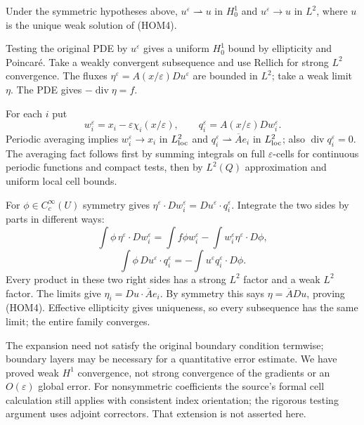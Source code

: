 \begin{theorem}
Under the symmetric hypotheses above,
$u^\varepsilon\rightharpoonup u$ in $H_0^1$ and
$u^\varepsilon\to u$ in $L^2$, where $u$ is the unique weak solution of (HOM4).
\end{theorem}
\begin{expandedproof}
Testing the original PDE by $u^\varepsilon$ gives a uniform $H_0^1$
bound by ellipticity and Poincar\'e.
Take a weakly convergent subsequence and use Rellich for strong $L^2$
convergence. The fluxes
$\eta^\varepsilon=A(x/\varepsilon)Du^\varepsilon$
are bounded in $L^2$; take a weak limit $\eta$.
The PDE gives $-\operatorname{div}\eta=f$.

For each $i$ put
\[
 w_i^\varepsilon=x_i-\varepsilon\chi_i(x/\varepsilon),\qquad
 q_i^\varepsilon=A(x/\varepsilon)Dw_i^\varepsilon .
\]
Periodic averaging implies $w_i^\varepsilon\to x_i$ in $L^2_{\rm loc}$
and $q_i^\varepsilon\rightharpoonup\overline A e_i$ in $L^2_{\rm loc}$;
also $\operatorname{div}q_i^\varepsilon=0$.
The averaging fact follows first by summing integrals on full
$\varepsilon$-cells for continuous periodic functions and compact tests,
then by $L^2(Q)$ approximation and uniform local cell bounds.

For $\phi\in C_c^\infty(U)$ symmetry gives
$\eta^\varepsilon\cdot Dw_i^\varepsilon
=Du^\varepsilon\cdot q_i^\varepsilon$.
Integrate the two sides by parts in different ways:
\[
 \int\phi\,\eta^\varepsilon\cdot Dw_i^\varepsilon
 =\int f\phi w_i^\varepsilon-\int w_i^\varepsilon\eta^\varepsilon\cdot D\phi,
\]
\[
 \int\phi\,Du^\varepsilon\cdot q_i^\varepsilon
 =-\int u^\varepsilon q_i^\varepsilon\cdot D\phi .
\]
Every product in these two right sides has a strong $L^2$ factor
and a weak $L^2$ factor.
The limits give $\eta_i=Du\cdot\overline A e_i$.
By symmetry this says $\eta=\overline A Du$, proving (HOM4).
Effective ellipticity gives uniqueness, so every subsequence has the
same limit; the entire family converges.
\end{expandedproof}
\Needspace{45mm}
The expansion need not satisfy the original boundary condition termwise;
boundary layers may be necessary for a quantitative error estimate.
We have proved weak $H^1$ convergence, not strong convergence of
the gradients or an $O(\varepsilon)$ global error.
For nonsymmetric coefficients the source's formal cell calculation
still applies with consistent index orientation; the rigorous testing
argument uses adjoint correctors. That extension is not asserted here.